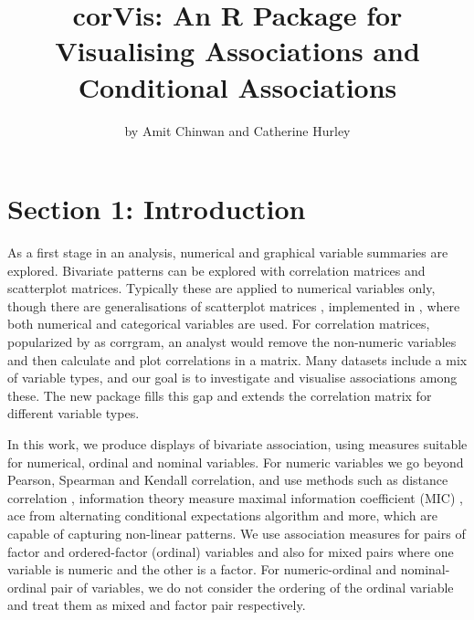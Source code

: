 \title{corVis: An R Package for Visualising Associations and Conditional
Associations}
\author{by Amit Chinwan and Catherine Hurley}

\maketitle


\hypertarget{section-1-introduction}{%
\section{Section 1: Introduction}\label{section-1-introduction}}

As a first stage in an analysis, numerical and graphical variable
summaries are explored. Bivariate patterns can be explored with
correlation matrices and scatterplot matrices. Typically these are
applied to numerical variables only, though there are generalisations of
scatterplot matrices \citep{emerson2013generalized}, implemented in
, where both numerical and categorical variables are
used. For correlation matrices, popularized by
\citet{friendly2002corrgrams} as corrgram, an analyst would remove the
non-numeric variables and then calculate and plot correlations in a
matrix. Many datasets include a mix of variable types, and our goal is
to investigate and visualise associations among these. The new package
 fills this gap and extends the correlation matrix for
different variable types.

In this work, we produce displays of bivariate association, using
measures suitable for numerical, ordinal and nominal variables. For
numeric variables we go beyond Pearson, Spearman and Kendall
correlation, and use methods such as distance correlation
\citep{szekely2007measuring}, information theory measure maximal
information coefficient (MIC) \citep{reshef2011detecting}, ace from
alternating conditional expectations algorithm and more, which are
capable of capturing non-linear patterns. We use association measures
for pairs of factor and ordered-factor (ordinal) variables and also for
mixed pairs where one variable is numeric and the other is a factor. For
numeric-ordinal and nominal-ordinal pair of variables, we do not
consider the ordering of the ordinal variable and treat them as mixed
and factor pair respectively.


